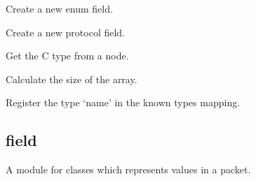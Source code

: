 \documentclass[A4paper,10pt,english]{sphinxmanual}
\begin{document}
\begin{fulllineitems}

\begin{fulllineitems}
\label{devel/code:cparser.StructVisitor._create_enum}
Create a new enum field.

\end{fulllineitems}


\begin{fulllineitems}
\label{devel/code:cparser.StructVisitor._create_protocol_field}
Create a new protocol field.

\end{fulllineitems}


\begin{fulllineitems}
\label{devel/code:cparser.StructVisitor._get_type}
Get the C type from a node.

\end{fulllineitems}


\begin{fulllineitems}
\label{devel/code:cparser.StructVisitor._get_array_size}
Calculate the size of the array.

\end{fulllineitems}


\begin{fulllineitems}
\label{devel/code:cparser.StructVisitor._register_type}
Register the type `name' in the known types mapping.

\end{fulllineitems}


\end{fulllineitems}



\subsection{field}
\label{devel/code:field}\label{devel/code:module-field}
A module for classes which represents values in a packet.
\end{document}

